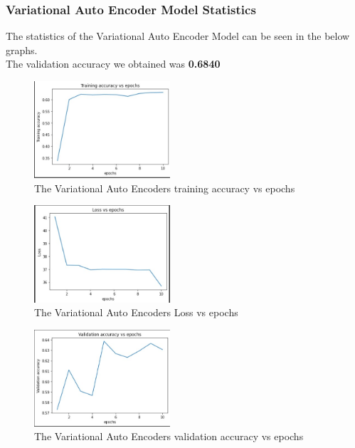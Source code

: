 \documentclass[10pt,twocolumn,letterpaper]{article}
\begin{document}
\subsubsection{Variational Auto Encoder Model Statistics}
The statistics of the Variational Auto Encoder Model can be seen in the below graphs.\\
The validation accuracy we obtained was \textbf{0.6840}
\begin{figure}[h]
    \includegraphics[width = 0.45\textwidth]{src/img/graphs/vae_acc.jpg}
    \caption{The Variational Auto Encoders training accuracy vs epochs}
    \label{fig:incep}
\end{figure}

\begin{figure}[h]
    \includegraphics[width = 0.45\textwidth]{src/img/graphs/vae_loss.jpg}
    \caption{The Variational Auto Encoders Loss vs epochs}
    \label{fig:incep}
\end{figure}

\begin{figure}[h]
    \includegraphics[width = 0.45\textwidth]{src/img/graphs/vae_val_acc.jpg}
    \caption{The Variational Auto Encoders validation accuracy vs epochs}
    \label{fig:incep}
\end{figure}
\end{document}
